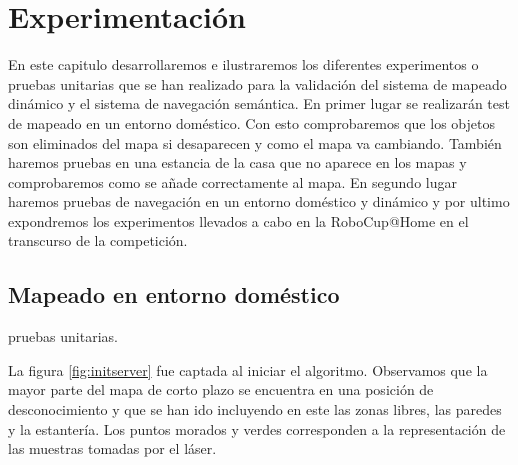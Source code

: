 \chapter{Experimentación}
\label{cap:experimentacion}
En este capitulo desarrollaremos e ilustraremos los diferentes experimentos o pruebas unitarias que se han realizado para la validación del sistema de mapeado dinámico y el sistema de navegación semántica. En primer lugar se realizarán test de mapeado en un entorno doméstico. Con esto comprobaremos que los objetos son eliminados del mapa si desaparecen y como el mapa va cambiando. También haremos pruebas en una estancia de la casa que no aparece en los mapas y comprobaremos como se añade correctamente al mapa. En segundo lugar haremos pruebas de navegación en un entorno doméstico y dinámico y por ultimo expondremos los experimentos llevados a cabo en la RoboCup@Home en el transcurso de la competición.

\section {Mapeado en entorno doméstico}
\label{cap:mapeadodomestico}

pruebas unitarias. 


La figura \ref{fig:initserver} fue captada al iniciar el algoritmo. Observamos que la mayor parte del mapa de corto plazo se encuentra en una posición de desconocimiento y que se han ido incluyendo en este las zonas libres, las paredes y la estantería. Los puntos morados y verdes corresponden a la representación de las muestras tomadas por el láser.

